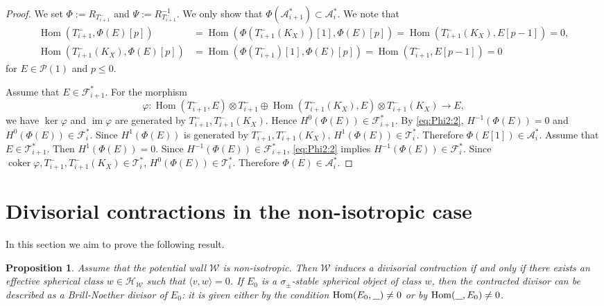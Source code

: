 \documentclass[leqno,11pt]{amsart}
\def\Hom{\mathop{\mathrm{Hom}}\nolimits}
\def\im{\mathop{\mathrm{im}}\nolimits}
\def\coker{\mathop{\mathrm{coker}}\nolimits}
\def\blank{\underline{\hphantom{A}}}
\newtheorem{Prop}[Thm]{Proposition}
\theoremstyle{definition}
\def\AA{\ensuremath{\mathcal A}}
\def\FF{\ensuremath{\mathcal F}}
\def\HH{\ensuremath{\mathcal H}}
\def\PP{\ensuremath{\mathcal P}}
\def\TT{\ensuremath{\mathcal T}}
\def\WW{\ensuremath{\mathcal W}}
\begin{document}
\begin{proof}
We set $\Phi:=R_{T_{i+1}^-}$ and $\Psi:=R_{T_{i+1}^-}^{-1}$.
We only show that 
$\Phi(\AA_{i+1}^*) \subset \AA_i^*$.
We note that 
\begin{equation}\label{eq:Phi2:2}
\begin{split}
\Hom(T_{i+1}^-,\Phi(E)[p])& =\Hom(\Phi(T_{i+1}^-(K_X))[1],\Phi(E)[p])
=\Hom(T_{i+1}^-(K_X),E[p-1])=0,\\
\Hom(T_{i+1}^-(K_X),\Phi(E)[p])&=\Hom(\Phi(T_{i+1}^-)[1],\Phi(E)[p])
=\Hom(T_{i+1}^-,E[p-1])=0
\end{split}
\end{equation}
for $E \in \PP(1)$ and $p \leq 0$.

Assume that $E \in \FF_{i+1}^*$.
For the morphism
\begin{equation}
\varphi:\Hom(T_{i+1}^-,E) \otimes T_{i+1}^- \oplus  
\Hom(T_{i+1}^-(K_X),E) \otimes T_{i+1}^- (K_X)
\to E,
\end{equation}
we have $\ker\varphi$ and $\im \varphi$ are generated by
$T_{i+1}^-,T_{i+1}^- (K_X)$.
Hence $H^0(\Phi(E)) \in \FF_{i+1}^*$.
By \eqref{eq:Phi2:2}, $H^{-1}(\Phi(E))=0$ and 
$H^0(\Phi(E)) \in \FF_i^*$.
Since $H^1(\Phi(E))$ is generated by
$T_{i+1}^-,T_{i+1}^- (K_X)$,
$H^1(\Phi(E)) \in \TT_i^*$.
Therefore $\Phi(E[1]) \in \AA_i^*$.
Assume that $E \in \TT_{i+1}^*$.
Then $H^1(\Phi(E))=0$.
Since $H^{-1}(\Phi(E)) \in \FF_{i+1}^*$, \eqref{eq:Phi2:2} implies
$H^{-1}(\Phi(E)) \in \FF_i^*$.
Since $\coker \varphi, T_{i+1}^-, T_{i+1}^- (K_X) \in \TT_i^*$,
$H^0(\Phi(E)) \in \TT_i^*$.
Therefore $\Phi(E) \in \AA_i^*$.
\end{proof}







\section{Divisorial contractions in the non-isotropic case}
In this section we aim to prove the following result.

\begin{Prop}
Assume that the potential wall $\WW$ is non-isotropic.  Then $\WW$ induces a divisorial contraction if and only if there exists an effective spherical class $w\in\HH_{\WW}$ such that $\langle v,w\rangle=0$.  If $E_0$ is a $\sigma_{\pm}$-stable spherical object of class $w$, then the contracted divisor can be described as a Brill-Noether divisor of $E_0$: it is given either by the condition $\Hom(E_0,\blank)\neq 0$ or by $\Hom(\blank,E_0)\neq 0$.
\end{Prop}
\end{document}

